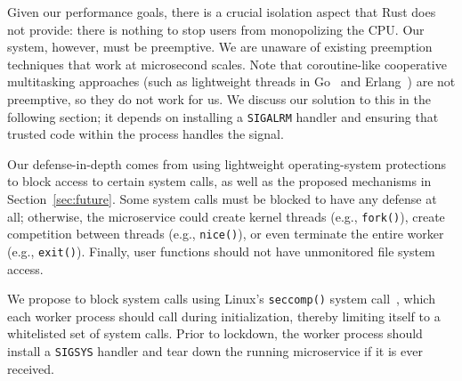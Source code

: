 Given our performance goals, there is a crucial isolation aspect that
Rust does not provide: there is nothing to stop users from monopolizing the CPU\@.
Our system, however, must be preemptive. We are unaware of existing preemption
techniques that work at microsecond scales. Note that coroutine-like
cooperative multitasking approaches (such as lightweight threads in
Go~\cite{www-golang} and Erlang~\cite{www-erlang}) are not preemptive, so they
do not work for us. We discuss our solution to this in the following section;
it depends on installing a \texttt{SIGALRM} handler and ensuring that trusted
code within the process handles the signal.

Our defense-in-depth comes from using lightweight operating-system protections
to block access to certain system calls, as well as the proposed mechanisms
in Section~\ref{sec:future}.  Some system calls must be blocked to have any
defense at all; otherwise, the microservice could create kernel threads (e.g.,
\texttt{fork()}), create competition between threads (e.g., \texttt{nice()}), or even
terminate the entire worker (e.g., \texttt{exit()}). Finally, user functions should
not have unmonitored file system access.

We propose to block system calls using Linux's \texttt{seccomp()} system
call~\cite{seccomp-manpage}, which each worker process should call during
initialization, thereby limiting itself to a whitelisted set of system calls.
Prior to lockdown, the worker process should install a \texttt{SIGSYS} handler and
tear down the running microservice if it is ever received.
